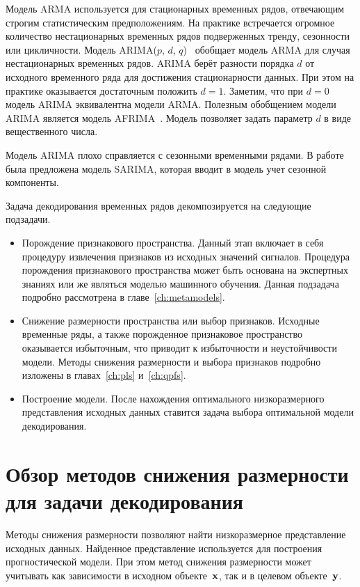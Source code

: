 Модель ARMA используется для стационарных временных рядов, отвечающим строгим статистическим предположениям. 
На практике встречается огромное количество нестационарных временных рядов подверженных тренду, сезонности или цикличности.
Модель ARIMA($p$, $d$, $q$)~\cite{cochrane2005time} обобщает модель ARMA для случая нестационарных временных рядов.
ARIMA берёт разности порядка $d$ от исходного временного ряда для достижения стационарности данных. 
При этом на практике оказывается достаточным положить $d = 1$.
Заметим, что при $d = 0$ модель ARIMA эквивалентна модели ARMA. 
Полезным обобщением модели ARIMA является модель AFRIMA~\cite{galbraith2001autoregression}. 
Модель позволяет задать параметр $d$ в виде вещественного числа.

Модель ARIMA плохо справляется с сезонными временными рядами.
В работе~\cite{box2011time} была предложена модель SARIMA, которая вводит в модель учет сезонной компоненты.

Задача декодирования временных рядов декомпозируется на следующие подзадачи.
\begin{itemize}
	\item Порождение признакового пространства. 
	Данный этап включает в себя процедуру извлечения признаков из исходных значений сигналов. 
	Процедура порождения признакового пространства может быть основана на экспертных знаниях или же являться моделью машинного обучения. 
	Данная подзадача подробно рассмотрена в главе~\ref{ch:metamodels}.
	
	\item Снижение размерности пространства или выбор признаков. 
	Исходные временные ряды, а также порожденное признаковое пространство оказывается избыточным, что приводит к избыточности и неустойчивости модели. 
	Методы снижения размерности и выбора признаков подробно изложены в главах~\ref{ch:pls} и~\ref{ch:qpfs}.
	
	\item Построение модели.
	После нахождения оптимального низкоразмерного представления исходных данных ставится задача выбора оптимальной модели декодирования.
\end{itemize}

\section{Обзор методов снижения размерности для задачи декодирования}
\label{sec:ch1:dim_reduction}
Методы снижения размерности позволяют найти низкоразмерное представление исходных данных. 
Найденное представление используется для построения прогностической модели.
При этом метод снижения размерности может учитывать как зависимости в исходном объекте~$\mathbf{x}$, так и в целевом объекте~$\mathbf{y}$.

